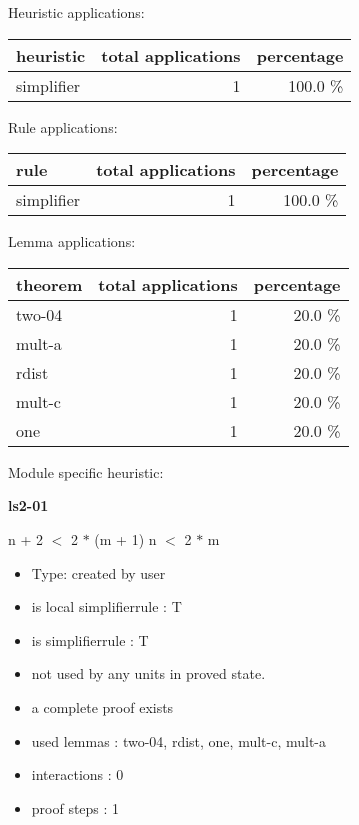 \documentclass[a4paper]{article}
\begin{document}
\medskip


Heuristic applications:

\begin{supertabular}{l|r|r}
heuristic	& total applications & percentage \\ \hline
simplifier & 1 & 100.0 \% \\

\end{supertabular}

Rule applications:

\begin{supertabular}{l|r|r}
rule	        & total applications & percentage \\ \hline
simplifier & 1 & 100.0 \% \\

\end{supertabular}

Lemma applications:

\begin{supertabular}{l|r|r}
theorem	        & total applications & percentage \\ \hline
two-04 & 1 & 20.0 \% \\
mult-a & 1 & 20.0 \% \\
rdist & 1 & 20.0 \% \\
mult-c & 1 & 20.0 \% \\
one & 1 & 20.0 \% \\

\end{supertabular}

Module specific heuristic:

\pagebreak

{\LARGE\bf ls2-01}\label{lemma-ls2-01}

\medskip

 \Fol n + 2 $<$ 2 $*$ (m + 1) \Equiv n $<$ 2 $*$ m

\begin{itemize}

\item Type: created by user

\item is local simplifierrule : T
\item is simplifierrule : T
\item not used by any units in proved state.
\item       a complete proof exists
\item       used lemmas  : two-04, rdist, one, mult-c, mult-a
\item       interactions : 0
\item       proof steps  : 1
\end{itemize}
\end{document}
